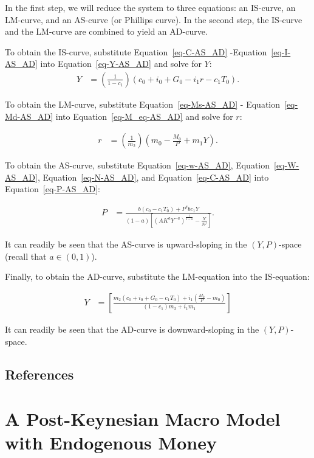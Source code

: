 \documentclass[
  letterpaper,
  DIV=11,
  numbers=noendperiod]{scrreprt}
\begin{document}
In the first step, we will reduce the system to three equations: an
IS-curve, an LM-curve, and an AS-curve (or Phillips curve). In the
second step, the IS-curve and the LM-curve are combined to yield an
AD-curve.

To obtain the IS-curve, substitute Equation~\ref{eq-C-AS_AD}
-Equation~\ref{eq-I-AS_AD} into Equation~\ref{eq-Y-AS_AD} and solve for
\(Y\): \begin{align}\label{eq:IS-AS_AD}\tag{IS}
Y&=\left(\frac{1}{1-c_1}\right)(c_0 + i_0 + G_0 - i_1r - c_1 T_0).
\end{align}

To obtain the LM-curve, substitute Equation~\ref{eq-Ms-AS_AD} -
Equation~\ref{eq-Md-AS_AD} into Equation~\ref{eq-M_eq-AS_AD} and solve
for \(r\):

\begin{align}\label{eq:LM-AS_AD}\tag{LM}
r&=\left(\frac{1}{m_2}\right)(m_0 - \frac{M_0}{P} + m_1Y).
\end{align}

To obtain the AS-curve, substitute Equation~\ref{eq-w-AS_AD},
Equation~\ref{eq-W-AS_AD}, Equation~\ref{eq-N-AS_AD}, and
Equation~\ref{eq-C-AS_AD} into Equation~\ref{eq-P-AS_AD}:

\begin{align}\label{eq:AS}\tag{AS}
P&=\frac{b(c_0-c_1T_0)+ P^ebc_1Y}{(1-a)\left[\left(AK^aY^{-a}\right)^{\frac{1}{1-a}} - \frac{Y}{N^f}\right]}.
\end{align}

It can readily be seen that the AS-curve is upward-sloping in the
\((Y, P)\)-space (recall that \(a \in (0,1)\)).

Finally, to obtain the AD-curve, substitute the LM-equation into the
IS-equation:

\begin{align}\tag{AD}
Y&=\left[\frac{m_2(c_0 + i_0 + G_0 - c_1 T_0) + i_1(\frac{M_0}{P}-m_0)}{(1-c_1)m_2+i_1m_1}\right]
\end{align}

It can readily be seen that the AD-curve is downward-sloping in the
\((Y, P)\)-space.

\section*{References}\label{references-3}


\chapter{A Post-Keynesian Macro Model with Endogenous
Money}\label{a-post-keynesian-macro-model-with-endogenous-money}
\end{document}
